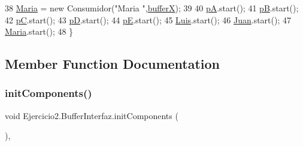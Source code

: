 \begin{DoxyCode}
38         \mbox{\hyperlink{class_ejercicio2_1_1_buffer_interfaz_adce3b96e30b916c4092f6819c0f18c4c}{Maria}} = \textcolor{keyword}{new} Consumidor(\textcolor{stringliteral}{"Maria "},\mbox{\hyperlink{class_ejercicio2_1_1_buffer_interfaz_a53107ffeb83ad39dffdd24c9a407e67e}{bufferX}});
39        
40         \mbox{\hyperlink{class_ejercicio2_1_1_buffer_interfaz_a4c656d5f1223294683178ad24f8c3fa1}{pA}}.start();
41         \mbox{\hyperlink{class_ejercicio2_1_1_buffer_interfaz_a844da0419730d90cc3d20549a3d6c840}{pB}}.start();
42         \mbox{\hyperlink{class_ejercicio2_1_1_buffer_interfaz_a598f50ad3180df0873baf164c96ff4b0}{pC}}.start();
43         \mbox{\hyperlink{class_ejercicio2_1_1_buffer_interfaz_a96002d44eb72523566a53020398c2d18}{pD}}.start();
44         \mbox{\hyperlink{class_ejercicio2_1_1_buffer_interfaz_ab2940bb6ba9b5b1ab9ed270822f9ac02}{pE}}.start();
45         \mbox{\hyperlink{class_ejercicio2_1_1_buffer_interfaz_a351ede1cadc154a8baa884f648da3a9f}{Luis}}.start();
46         \mbox{\hyperlink{class_ejercicio2_1_1_buffer_interfaz_add59e765dfa159c7f2d3c4e2e02458b7}{Juan}}.start();
47         \mbox{\hyperlink{class_ejercicio2_1_1_buffer_interfaz_adce3b96e30b916c4092f6819c0f18c4c}{Maria}}.start();
48     \}
\end{DoxyCode}


\subsection{Member Function Documentation}
\mbox{\label{class_ejercicio2_1_1_buffer_interfaz_a410934c1224871aae42d82ffacf5d624}} 
\subsubsection{\texorpdfstring{init\+Components()}{initComponents()}}
{\footnotesize\ttfamily void Ejercicio2.\+Buffer\+Interfaz.\+init\+Components (\begin{DoxyParamCaption}{ }\end{DoxyParamCaption})\hspace{0.3cm}{\ttfamily [inline]}, {\ttfamily [private]}}

